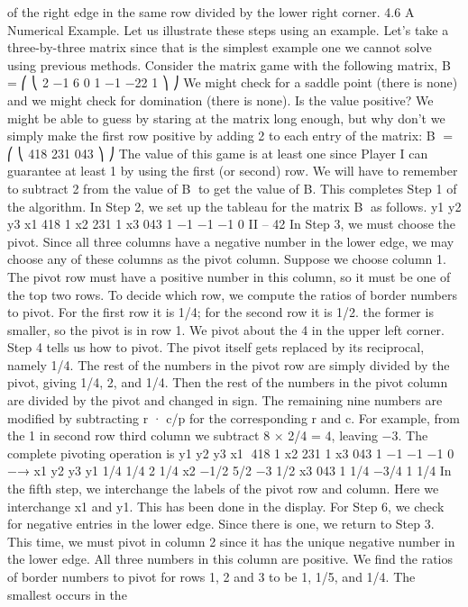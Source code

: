 of the right edge in the same row divided by the lower right corner.
4.6 A Numerical Example. Let us illustrate these steps using an example. Let’s
take a three-by-three matrix since that is the simplest example one we cannot solve using
previous methods. Consider the matrix game with the following matrix,
B =
⎛
⎝
2 −1 6
0 1 −1
−22 1
⎞
⎠
We might check for a saddle point (there is none) and we might check for domination
(there is none). Is the value positive? We might be able to guess by staring at the matrix
long enough, but why don’t we simply make the first row positive by adding 2 to each
entry of the matrix:
B =
⎛
⎝
418
231
043
⎞
⎠
The value of this game is at least one since Player I can guarantee at least 1 by using the
first (or second) row. We will have to remember to subtract 2 from the value of B to get
the value of B. This completes Step 1 of the algorithm.
In Step 2, we set up the tableau for the matrix B as follows.
y1 y2 y3
x1 418 1
x2 231 1
x3 043 1
−1 −1 −1 0
II – 42
In Step 3, we must choose the pivot. Since all three columns have a negative number
in the lower edge, we may choose any of these columns as the pivot column. Suppose we
choose column 1. The pivot row must have a positive number in this column, so it must be
one of the top two rows. To decide which row, we compute the ratios of border numbers
to pivot. For the first row it is 1/4; for the second row it is 1/2. the former is smaller, so
the pivot is in row 1. We pivot about the 4 in the upper left corner.
Step 4 tells us how to pivot. The pivot itself gets replaced by its reciprocal, namely
1/4. The rest of the numbers in the pivot row are simply divided by the pivot, giving 1/4,
2, and 1/4. Then the rest of the numbers in the pivot column are divided by the pivot and
changed in sign. The remaining nine numbers are modified by subtracting r · c/p for the
corresponding r and c. For example, from the 1 in second row third column we subtract
8 × 2/4 = 4, leaving −3. The complete pivoting operation is
y1 y2 y3
x1 418 1
x2 231 1
x3 043 1
−1 −1 −1 0
−→
x1 y2 y3
y1 1/4 1/4 2 1/4
x2 −1/2 5/2 −3 1/2
x3 043 1
1/4 −3/4 1 1/4
In the fifth step, we interchange the labels of the pivot row and column. Here we
interchange x1 and y1. This has been done in the display.
For Step 6, we check for negative entries in the lower edge. Since there is one, we
return to Step 3.
This time, we must pivot in column 2 since it has the unique negative number in the
lower edge. All three numbers in this column are positive. We find the ratios of border
numbers to pivot for rows 1, 2 and 3 to be 1, 1/5, and 1/4. The smallest occurs in the

